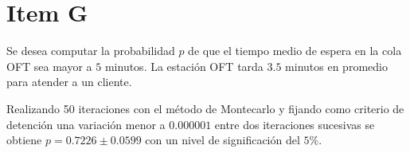 \documentclass[a4paper,10pt]{article}
\begin{document}
\section*{Item G}

Se desea computar la probabilidad $p$ de que el tiempo medio de espera en la cola
OFT sea mayor a $5$ minutos. La estaci\'on OFT tarda $3.5$ minutos en promedio
para atender a un cliente.

Realizando 50 iteraciones con el m\'etodo de Montecarlo y fijando
como criterio de detenci\'on una variaci\'on menor a $0.000001$ entre dos iteraciones
sucesivas se obtiene $p = 0.7226 \pm 0.0599$ con un nivel de significaci\'on
del $5\%$. 
\end{document}
